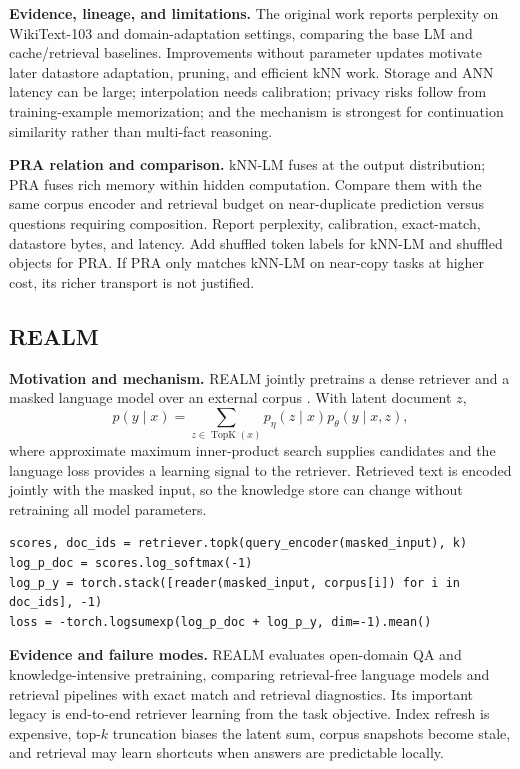 \textbf{Evidence, lineage, and limitations.} The original work reports perplexity on
WikiText-103 and domain-adaptation settings, comparing the base LM and cache/retrieval
baselines.  Improvements without parameter updates motivate later datastore adaptation,
pruning, and efficient kNN work.  Storage and ANN latency can be large; interpolation needs
calibration; privacy risks follow from training-example memorization; and the mechanism is
strongest for continuation similarity rather than multi-fact reasoning.

\textbf{PRA relation and comparison.} kNN-LM fuses at the output distribution; PRA fuses
rich memory within hidden computation.  Compare them with the same corpus encoder and
retrieval budget on near-duplicate prediction versus questions requiring composition.
Report perplexity, calibration, exact-match, datastore bytes, and latency.  Add shuffled
token labels for kNN-LM and shuffled objects for PRA.  If PRA only matches kNN-LM on
near-copy tasks at higher cost, its richer transport is not justified.

\subsection{REALM}

\textbf{Motivation and mechanism.} REALM jointly pretrains a dense retriever and a masked
language model over an external corpus \citep{guu2020realm}.  With latent document $z$,
\begin{equation}
p(y\mid x)=\sum_{z\in\operatorname{TopK}(x)}p_\eta(z\mid x)
p_\theta(y\mid x,z),
\end{equation}
where approximate maximum inner-product search supplies candidates and the language loss
provides a learning signal to the retriever.  Retrieved text is encoded jointly with the
masked input, so the knowledge store can change without retraining all model parameters.

\begin{lstlisting}[caption={REALM-style latent-document marginalization}]
scores, doc_ids = retriever.topk(query_encoder(masked_input), k)
log_p_doc = scores.log_softmax(-1)
log_p_y = torch.stack([reader(masked_input, corpus[i]) for i in doc_ids], -1)
loss = -torch.logsumexp(log_p_doc + log_p_y, dim=-1).mean()
\end{lstlisting}

\textbf{Evidence and failure modes.} REALM evaluates open-domain QA and knowledge-intensive
pretraining, comparing retrieval-free language models and retrieval pipelines with exact
match and retrieval diagnostics.  Its important legacy is end-to-end retriever learning
from the task objective.  Index refresh is expensive, top-$k$ truncation biases the latent
sum, corpus snapshots become stale, and retrieval may learn shortcuts when answers are
predictable locally.

